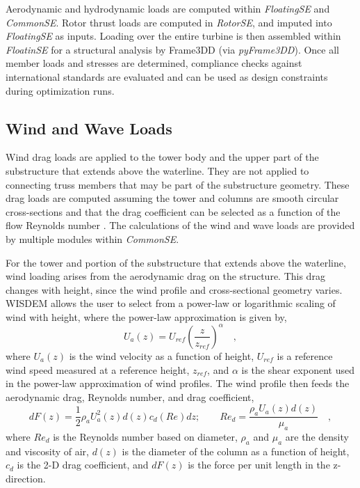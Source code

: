 Aerodynamic and hydrodynamic loads are computed within
\textit{FloatingSE} and \textit{CommonSE}.  Rotor thrust loads are
computed in \textit{RotorSE}, and imputed into \textit{FloatingSE} as
inputs.  Loading over the entire turbine is then assembled within
\textit{FloatinSE} for a structural analysis by Frame3DD (via
\textit{pyFrame3DD}).  Once all member loads and stresses are
determined, compliance checks against international standards are
evaluated and can be used as design constraints during optimization
runs.

\subsection{Wind and Wave Loads}
Wind drag loads are applied to the tower body and the upper part of the
substructure that extends above the waterline.  They are not applied to
connecting truss members that may be part of the substructure geometry.
These drag loads are computed assuming the tower and columns are smooth
circular cross-sections and that the drag coefficient can be selected as
a function of the flow Reynolds number \citep{Roshko}.  The calculations
of the wind and wave loads are provided by multiple modules within
\textit{CommonSE}.

For the tower and portion of the substructure that extends above the
waterline, wind loading arises from the aerodynamic drag on the
structure.  This drag changes with height, since the wind profile and
cross-sectional geometry varies.  WISDEM allows the user to select from
a power-law or logarithmic scaling of wind with height, where the
power-law approximation is given by,
\[
  U_a(z) = U_{ref}\left(\frac{z}{z_{ref}}\right)^{\alpha}\quad,
\]
where $U_a(z)$ is the wind velocity as a function of height, $U_{ref}$ is a
reference wind speed measured at a reference height, $z_{ref}$, and
$\alpha$ is the shear exponent used in the power-law approximation of
wind profiles.  The wind profile then feeds the aerodynamic drag,
Reynolds number, and drag coefficient,
\begin{equation} \label{eqn:drag}
  dF(z) = \frac{1}{2} \rho_a U_a^2(z) d(z) c_d(Re) dz;\qquad
  Re_d = \frac{\rho_a U_a(z) d(z)}{\mu_a}\quad,
\end{equation}
where $Re_d$ is the Reynolds number based on diameter, $\rho_a$ and
$\mu_a$ are the density and viscosity of air, $d(z)$ is the diameter of
the column as a function of height, $c_d$ is the 2-D drag coefficient, and
$dF(z)$ is the force per unit length in the z-direction.

